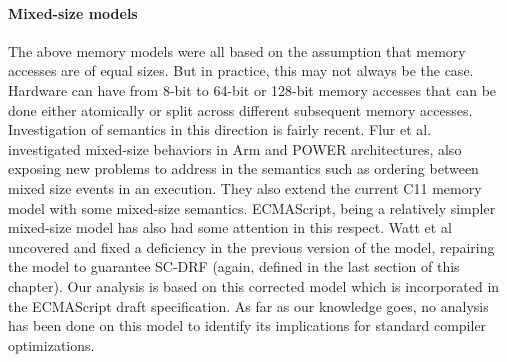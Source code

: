     \paragraph{Mixed-size models}
    The above memory models were all based on the assumption that memory accesses are of equal sizes. 
    But in practice, this may not always be the case. 
    Hardware can have from 8-bit to 64-bit or 128-bit memory accesses that can be done either atomically or split across different subsequent memory accesses. 
    Investigation of semantics in this direction is fairly recent.
    Flur et al.~\cite{Flur} investigated mixed-size behaviors in Arm and POWER architectures, also exposing new problems to address in the semantics such as ordering between mixed size events in an execution. 
    They also extend the current C11 memory model with some mixed-size semantics.
    ECMAScript, being a relatively simpler mixed-size model has also had some attention in this respect. 
    Watt et al~\cite{WattC} uncovered and fixed a deficiency in the previous version of the model, repairing the model to guarantee SC-DRF  (again, defined in the last section of this chapter).
    Our analysis is based on this corrected model which is incorporated in the ECMAScript draft specification. 
    As far as our knowledge goes, no analysis has been done on this model to identify its implications for standard compiler optimizations. 


